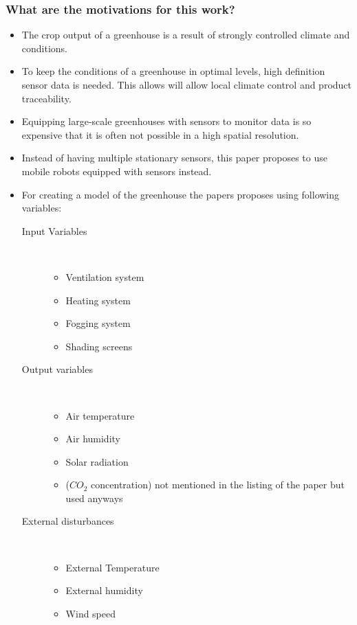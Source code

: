 \documentclass{article}
\begin{document}
\subsubsection*{What are the motivations for this work?}
\begin{itemize} 
    \item The crop output of a greenhouse is a result of strongly controlled climate and conditions. 
    \item To keep the conditions of a greenhouse in optimal levels, high definition sensor data is needed. This allows will allow local climate control and product traceability.
    \item Equipping large-scale greenhouses with sensors to monitor data is so expensive that it is often not possible in a high spatial resolution.
    \item Instead of having multiple stationary sensors, this paper proposes to use mobile robots equipped with sensors instead.
    \item For creating a model of the greenhouse the papers proposes using following variables:\begin{description}
        \item[Input Variables]  \ 
        \begin{itemize}
            \item Ventilation system
            \item Heating system
            \item Fogging system
            \item Shading screens
        \end{itemize}
        \item[Output variables]   \ 
        \begin{itemize}
            \item Air temperature
            \item Air humidity
            \item Solar radiation
            \item ($CO_2$ concentration) not mentioned in the listing of the paper but used anyways
        \end{itemize}
        \item[External disturbances]\ 
        \begin{itemize}
            \item External Temperature
            \item External humidity
            \item Wind speed

\end{itemize}
\end{description}
\end{itemize}
\end{document}
